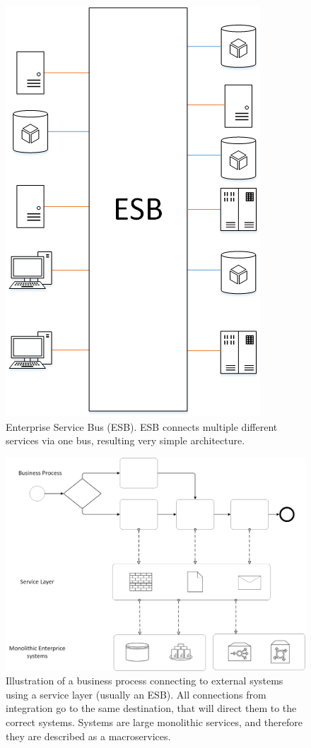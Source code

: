 \documentclass[english, 12pt, a4paper, sci, utf8, a-2b, online, obeyspaces]{aaltothesis}
\begin{document}
\begin{figure}[htb]
  \centering
      \includegraphics[scale=0.7]{pictures/Architecture/ESB.png}
  \caption{Enterprise Service Bus (ESB). ESB connects multiple different services via one bus, resulting very simple architecture.}
  \label{fig:esb}
\end{figure}

\begin{figure}[htbp]
  \centering
      \includegraphics[width=\textwidth]{pictures/Architecture/Macroservices.png}
  \caption{Illustration of a business process connecting to external systems using a service layer (usually an ESB). All connections from integration go to the same destination, that will direct them to the correct systems. Systems are large monolithic services, and therefore they are described as a macroservices. }
  \label{fig:macroservices}
\end{figure}
\end{document}
